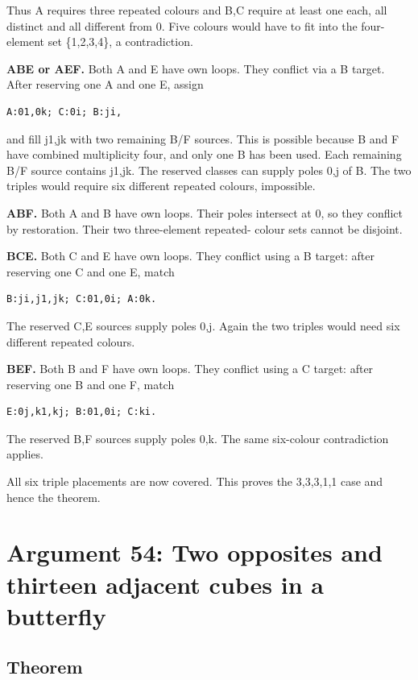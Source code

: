 \documentclass[
  10pt,
]{article}
\begin{document}
Thus A requires three repeated colours and B,C require at least one
each, all distinct and all different from 0. Five colours would have to
fit into the four-element set \{1,2,3,4\}, a contradiction.

\textbf{ABE or AEF.} Both A and E have own loops. They conflict via a B
target. After reserving one A and one E, assign

\begin{verbatim}
A:01,0k; C:0i; B:ji,
\end{verbatim}

and fill j1,jk with two remaining B/F sources. This is possible because
B and F have combined multiplicity four, and only one B has been used.
Each remaining B/F source contains j1,jk. The reserved classes can
supply poles 0,j of B. The two triples would require six different
repeated colours, impossible.

\textbf{ABF.} Both A and B have own loops. Their poles intersect at 0,
so they conflict by restoration. Their two three-element repeated-
colour sets cannot be disjoint.

\textbf{BCE.} Both C and E have own loops. They conflict using a B
target: after reserving one C and one E, match

\begin{verbatim}
B:ji,j1,jk; C:01,0i; A:0k.
\end{verbatim}

The reserved C,E sources supply poles 0,j. Again the two triples would
need six different repeated colours.

\textbf{BEF.} Both B and F have own loops. They conflict using a C
target: after reserving one B and one F, match

\begin{verbatim}
E:0j,k1,kj; B:01,0i; C:ki.
\end{verbatim}

The reserved B,F sources supply poles 0,k. The same six-colour
contradiction applies.

All six triple placements are now covered. This proves the 3,3,3,1,1
case and hence the theorem.

\hypertarget{arg-54}{%
\section{Argument 54: Two opposites and thirteen adjacent cubes in a
butterfly}\label{arg-54}}

\hypertarget{theorem-5}{%
\subsection*{Theorem}\label{theorem-5}}
\end{document}
